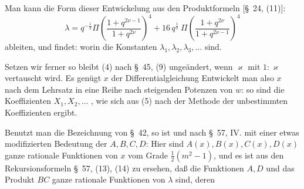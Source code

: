 Man kann die Form dieser Entwickelung aus den Produktformeln [\S\ 24, (11)]:
\[
\lambda = q^{-\frac{1}{2}} \Pi\left(\frac{1+q^{2\nu-1}}{1+q^{2\nu}}\right)^4 + 16\,q^{\frac{1}{2}}\ \Pi\left(\frac{1+q^{2\nu}}{1+q^{2\nu-1}}\right)^4
\]
ableiten, und findet:
worin die Konstanten $\lambda_1, \lambda_2, \lambda_3, \ldots$  sind.

Setzen wir ferner
so bleibt (4) nach \S\ 45, (9) ungeändert, wenn $\varkappa$ mit $1:\varkappa$ vertauscht wird. Es genügt $x$ der Differentialgleichung
Entwickelt man also $x$ nach dem  Lehrsatz in eine Reihe nach steigenden Potenzen von $w$:
so sind die Koeffizienten $X_1, X_2, \ldots$ , wie sich aus (5) nach der Methode der unbestimmten Koeffizienten ergibt.

Benutzt man die Bezeichnung von \S\ 42, so ist
und nach \S\ 57, IV. mit einer etwas modifizierten Bedeutung der $A, B, C, D$:
Hier sind $A(x), B(x), C(x), D(x)$ ganze rationale Funktionen von $x$ vom Grade $\frac{1}{2}(m^2-1)$, und es ist aus den Rekursionsformeln \S\ 57, (13), (14) zu ersehen, daß die Funktionen $A, D$ und das Produkt $BC$ ganze rationale Funktionen von $\lambda$ sind, deren
